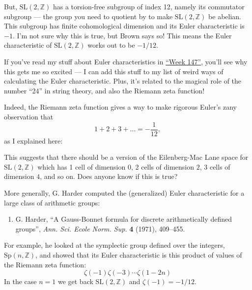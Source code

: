 \documentclass{article}
\def\tightlist{}
\renewcommand{\texttt}[1]{%
  \begingroup
  \ttfamily
  \begingroup\lccode`~=`/\lowercase{\endgroup\def~}{/\discretionary{}{}{}}%
  \begingroup\lccode`~=`[\lowercase{\endgroup\def~}{[\discretionary{}{}{}}%
  \begingroup\lccode`~=`.\lowercase{\endgroup\def~}{.\discretionary{}{}{}}%
  \catcode`/=\active\catcode`[=\active\catcode`.=\active
  \scantokens{#1\noexpand}%
  \endgroup
}
\begin{document}
But, \(\mathrm{SL}(2,\mathbb{Z})\) has a torsion-free subgroup of index
12, namely its commutator subgroup --- the group you need to quotient by
to make \(\mathrm{SL}(2,\mathbb{Z})\) be abelian. This subgroup has
finite cohomological dimension and its Euler characteristic is \(-1\).
I'm not sure why this is true, but Brown says so! This means the Euler
characteristic of \(\mathrm{SL}(2,\mathbb{Z})\) works out to be
\(-1/12\).

If you've read my stuff about Euler characteristics in
\protect\hyperlink{week147}{``Week 147''}, you'll see why this gets me
so excited --- I can add this stuff to my list of weird ways of
calculating the Euler characteristic. Plus, it's related to the magical
role of the number ``24'' in string theory, and also the Riemann zeta
function!

Indeed, the Riemann zeta function gives a way to make rigorous Euler's
zany observation that \[1 + 2 + 3 + \ldots = -\frac{1}{12},\] as I
explained here:


This suggests that there should be a version of the Eilenberg-Mac Lane
space for \(\mathrm{SL}(2,\mathbb{Z})\) which has 1 cell of dimension
\(0\), 2 cells of dimension \(2\), 3 cells of dimension \(4\), and so
on. Does anyone know if this is true?

More generally, G. Harder computed the (generalized) Euler
characteristic for a large class of arithmetic groups:

\begin{enumerate}
\def\labelenumi{\arabic{enumi})}
\setcounter{enumi}{9}
\tightlist
\item
  G. Harder, ``A Gauss-Bonnet formula for discrete arithmetically
  defined groups'', \emph{Ann. Sci. Ecole Norm. Sup.} \textbf{4} (1971),
  409--455.
\end{enumerate}

For example, he looked at the symplectic group defined over the
integers, \(\mathrm{Sp}(n,\mathbb{Z})\), and showed that its Euler
characteristic is this product of values of the Riemann zeta function:
\[\zeta(-1) \zeta(-3) \cdots \zeta(1-2n)\] In the case \(n = 1\) we get
back \(\mathrm{SL}(2,\mathbb{Z})\) and \(\zeta(-1) = -1/12\).
\end{document}
